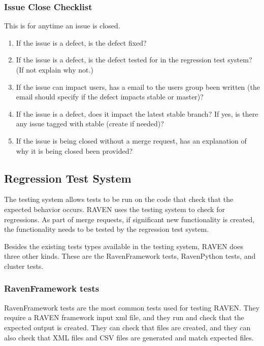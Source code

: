 \documentclass{article}
\begin{document}
\subsubsection{Issue Close Checklist}

This is for anytime an issue is closed.

\begin{enumerate}
\item  If the issue is a defect, is the defect fixed?
\item  If the issue is a defect, is the defect tested for in the regression test system? (If not explain why not.)
\item  If the issue can impact users, has a email to the users group been written (the email should specify if the defect impacts stable or master)?
\item  If the issue is a defect, does it impact the latest stable branch? If yes, is there any issue tagged with stable (create if needed)?
\item  If the issue is being closed without a merge request, has an explanation of why it is being closed been provided?
\end{enumerate}


\subsection{Regression Test System}


The  testing system allows tests to be run on the code that check
that the expected behavior occurs.  RAVEN uses the  testing
system to check for regressions.  As part of merge requests, if
significant new functionality is created, the functionality needs to
be tested by the regression test system.

Besides the existing tests types available in the  testing
system, RAVEN does three other kinds.  These are the RavenFramework
tests, RavenPython tests, and cluster tests.

\subsubsection{RavenFramework tests}

RavenFramework tests are the most common tests used for testing
RAVEN. They require a RAVEN framework input xml file, and they run and
check that the expected output is created.  They can check that files
are created, and they can also check that XML files and CSV files are
generated and match expected files.
\end{document}
